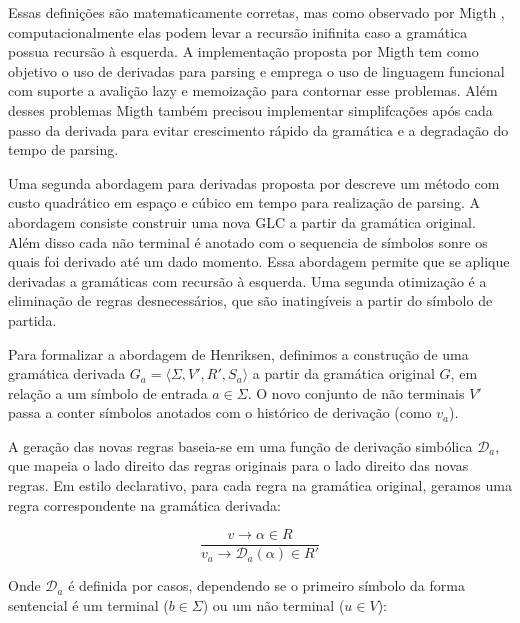 Essas definições são matematicamente corretas, mas como observado por Migth \cite{Might2011}, computacionalmente elas podem levar
a recursão inifinita caso a gramática possua recursão à esquerda. A implementação proposta por Migth tem como objetivo o uso de derivadas para
parsing e emprega o uso de linguagem funcional com suporte a avalição lazy e memoização para contornar esse problemas. Além desses problemas Migth também precisou implementar simplifcações após cada passo da derivada para evitar crescimento rápido da gramática e a degradação do tempo de parsing.

Uma segunda abordagem para derivadas proposta por \cite{Henriksen2019} descreve um método com custo quadrático em espaço e cúbico em tempo
para realização de parsing. A abordagem consiste construir uma nova GLC a partir da gramática original. Além disso cada não terminal é
anotado com o sequencia de símbolos sonre os quais foi derivado até um dado momento. Essa abordagem permite que se aplique derivadas
a gramáticas com recursão à esquerda. Uma segunda otimização é a eliminação de regras desnecessários, que são inatingíveis a partir do símbolo de
partida.


Para formalizar a abordagem de Henriksen, definimos a construção de uma gramática derivada $G_a = \langle \Sigma, V', R', S_a \rangle$ a partir da gramática original $G$, em relação a um símbolo de entrada $a \in \Sigma$. O novo conjunto de não terminais $V'$ passa a conter símbolos anotados com o histórico de derivação (como $v_a$).

A geração das novas regras baseia-se em uma função de derivação simbólica $\mathcal{D}_a$, que mapeia o lado direito das regras originais para o lado direito das novas regras. Em estilo declarativo, para cada regra na gramática original, geramos uma regra correspondente na gramática derivada:

\[
\frac{v \to \alpha \in R}{v_a \to \mathcal{D}_a(\alpha) \in R'}
\]

Onde $\mathcal{D}_a$ é definida por casos, dependendo se o primeiro símbolo da forma sentencial é um terminal ($b \in \Sigma$) ou um não terminal ($u \in V$):

